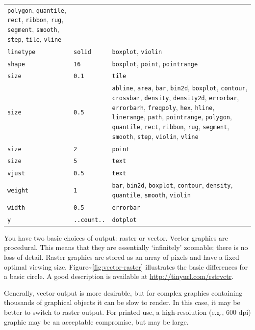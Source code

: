 \begin{longtable}[c]{@{}lll@{}}
\texttt{polygon}, \texttt{quantile}, \texttt{rect}, \texttt{ribbon},
\texttt{rug}, \texttt{segment}, \texttt{smooth}, \texttt{step},
\texttt{tile}, \texttt{vline}\tabularnewline
\texttt{linetype} & \texttt{solid} & \texttt{boxplot},
\texttt{violin}\tabularnewline
\texttt{shape} & \texttt{16} & \texttt{boxplot}, \texttt{point},
\texttt{pointrange}\tabularnewline
\texttt{size} & \texttt{0.1} & \texttt{tile}\tabularnewline
\texttt{size} & \texttt{0.5} & \texttt{abline}, \texttt{area},
\texttt{bar}, \texttt{bin2d}, \texttt{boxplot}, \texttt{contour},
\texttt{crossbar}, \texttt{density}, \texttt{density2d},
\texttt{errorbar}, \texttt{errorbarh}, \texttt{freqpoly}, \texttt{hex},
\texttt{hline}, \texttt{linerange}, \texttt{path}, \texttt{pointrange},
\texttt{polygon}, \texttt{quantile}, \texttt{rect}, \texttt{ribbon},
\texttt{rug}, \texttt{segment}, \texttt{smooth}, \texttt{step},
\texttt{violin}, \texttt{vline}\tabularnewline
\texttt{size} & \texttt{2} & \texttt{point}\tabularnewline
\texttt{size} & \texttt{5} & \texttt{text}\tabularnewline
\texttt{vjust} & \texttt{0.5} & \texttt{text}\tabularnewline
\texttt{weight} & \texttt{1} & \texttt{bar}, \texttt{bin2d},
\texttt{boxplot}, \texttt{contour}, \texttt{density}, \texttt{quantile},
\texttt{smooth}, \texttt{violin}\tabularnewline
\texttt{width} & \texttt{0.5} & \texttt{errorbar}\tabularnewline
\texttt{y} & \texttt{..count..} & \texttt{dotplot}\tabularnewline
\bottomrule
\end{longtable}


You have two basic choices of output: raster or vector. Vector graphics
are procedural. This means that they are essentially `infinitely'
zoomable; there is no loss of detail. Raster graphics are stored as an
array of pixels and have a fixed optimal viewing size.
Figure\textasciitilde{}\ref{fig:vector-raster} illustrates the basic
differences for a basic circle. A good description is available at
\url{http://tinyurl.com/rstrvctr}.  

Generally, vector output is more desirable, but for complex graphics
containing thousands of graphical objects it can be slow to render. In
this case, it may be better to switch to raster output. For printed use,
a high-resolution (e.g., 600 dpi) graphic may be an acceptable
compromise, but may be large.


